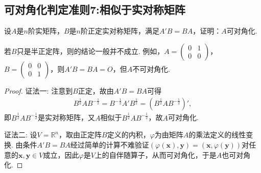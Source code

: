\documentclass[../../main.tex]{subfiles}
\begin{document}
\subsection{可对角化判定准则7:相似于实对称矩阵}

\begin{proposition}\label{proposition:例9.72}
设\(A\)是\(n\)阶实矩阵，\(B\)是\(n\)阶正定实对称矩阵，满足\(A'B = BA\)，证明：\(A\)可对角化.
\end{proposition}
\begin{remark}
若\(B\)只是半正定阵，则的结论一般并不成立. 例如，\(A=\begin{pmatrix}0&1\\0&0\end{pmatrix}\)，\(B=\begin{pmatrix}0&0\\0&1\end{pmatrix}\)，则\(A'B = BA = O\)，但\(A\)不可对角化. 
\end{remark}
\begin{proof}
{\color{blue}证法一:}
注意到\(B\)正定，故由\(A'B = BA\)可得
\begin{align*}
B^{\frac{1}{2}}AB^{-\frac{1}{2}}=B^{-\frac{1}{2}}A'B^{\frac{1}{2}}=(B^{\frac{1}{2}}AB^{-\frac{1}{2}})',
\end{align*}
即\(B^{\frac{1}{2}}AB^{-\frac{1}{2}}\)是实对称矩阵，又\(A\)相似于\(B^{\frac{1}{2}}AB^{-\frac{1}{2}}\)，故\(A\)可对角化.

{\color{blue}证法二:}
设\(V = \mathbb{R}^n\)，取由正定阵\(B\)定义的内积，\(\varphi\)为由矩阵\(A\)的乘法定义的线性变换. 由条件\(A'B = BA\)经过简单的计算不难验证\((\varphi(\boldsymbol{x}),\boldsymbol{y}) = (\boldsymbol{x},\varphi(\boldsymbol{y}))\)对任意的\(\boldsymbol{x},\boldsymbol{y}\in V\)成立，因此\(\varphi\)是\(V\)上的自伴随算子，从而可对角化，于是\(A\)也可对角化.
\end{proof}
\end{document}
